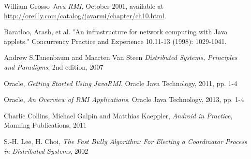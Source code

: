 \begin{thebibliography}{9}

 William Grosso \emph{Java RMI},  October 2001, available at
\url{http://oreilly.com/catalog/javarmi/chapter/ch10.html}.

Baratloo, Arash, et al. "An infrastructure for network computing with Java applets." Concurrency Practice and Experience 10.11-13 (1998): 1029-1041.

Andrew S.Tanenbaum and Maarten Van Steen
\emph{Distributed Systems, Principles and Paradigms}, 2nd edition, 2007

Oracle, \emph{Getting Started Using Java\texttrademark  RMI}, Oracle Java Technology, 2011, pp. 1-4

Oracle, \emph{An Overview of RMI Applications}, Oracle Java Technology, 2013, pp. 1-4

Charlie Collins, Michael Galpin and Matthias Kaeppler, \emph{Android in Practice}, Manning Publications, 2011

S.-H. Lee, H. Choi, \emph{The Fast Bully Algorithm: For Electing a Coordinator Process in Distributed Systems}, 2002


\end{thebibliography} 
